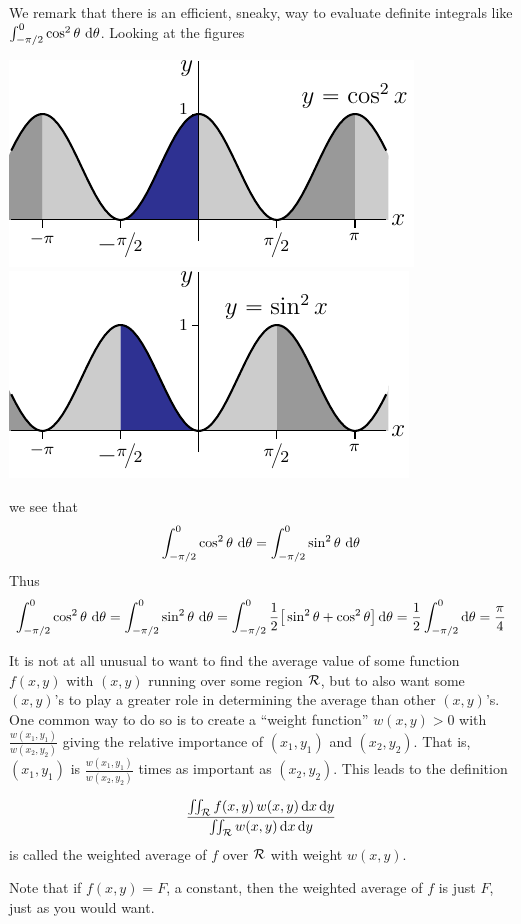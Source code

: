 \begin{remark}\label{rem sneaky}
We remark that there is an efficient, sneaky, way to evaluate
definite integrals like $\int_{-\pi/2}^0 \cos^2\theta\ \mathrm{d}\theta$.
Looking at the figures 
\begin{mfig}
\begin{center}
    \includegraphics{cos2graph.pdf}\qquad
    \includegraphics{sin2graph.pdf}
\end{center}
\end{mfig}
we see that 
\begin{equation*}
\int_{-\pi/2}^0 \cos^2\theta\ \mathrm{d}\theta
=\int_{-\pi/2}^0 \sin^2\theta\ \mathrm{d}\theta
\end{equation*}
Thus
\begin{align*}
\int_{-\pi/2}^0 \cos^2\theta\ \mathrm{d}\theta
=\int_{-\pi/2}^0 \sin^2\theta\ \mathrm{d}\theta
=\int_{-\pi/2}^0 \frac{1}{2}\big[\sin^2\theta+\cos^2\theta\big]\,\mathrm{d}\theta
=\frac{1}{2}\int_{-\pi/2}^0 \mathrm{d}\theta
=\frac{\pi}{4}
\end{align*}

\end{remark}

It is not at all unusual to want to find the average value of
some function $f(x,y)$ with $(x,y)$ running over some region
$\mathcal{R}$,  but to also want some $(x,y)$'s to play a greater role
in determining the average than other $(x,y)$'s. One common way to
do so is to create a ``weight function'' $w(x,y)>0$ with 
$\frac{w(x_1,y_1)}{w(x_2,y_2)}$ giving the relative importance of
$(x_1,y_1)$ and $(x_2,y_2)$. That is, $(x_1,y_1)$ is 
$\frac{w(x_1,y_1)}{w(x_2,y_2)}$ times as important as $(x_2,y_2)$.
This leads to the definition
\begin{defn}\label{def WTaverage}
\begin{align*}
\frac{\iint_{\mathcal{R}} f(x,y)\,w(x,y)\,\mathrm{d}x\,\mathrm{d}y}
                       {\iint_{\mathcal{R}} w(x,y)\,\mathrm{d}x\,\mathrm{d}y}
\end{align*}
is called the weighted average of $f$ over $\mathcal{R}$ with weight
$w(x,y)$.
\end{defn}\noindent
Note that if $f(x,y)=F$, a constant, then the weighted average of $f$
is just $F$, just as you would want.

